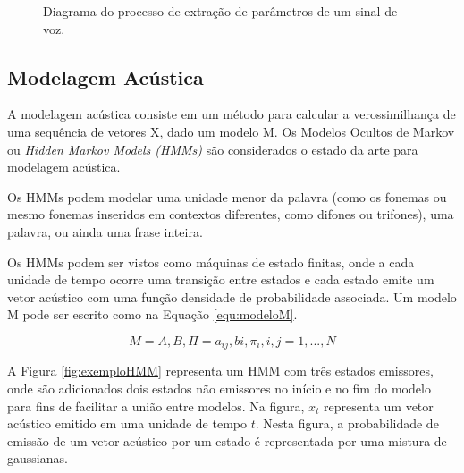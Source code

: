 \documentclass[12pt,a4paper,oneside]{report}
\begin{document}
\begin{figure}[h!]
\centering
{}\caption{Diagrama do processo de extração de parâmetros de um sinal de voz.}
\label{fig:extracao}
\end{figure}

\subsection{Modelagem Acústica}

A modelagem acústica consiste em um método para calcular a verossimilhança de uma sequência de vetores X, dado um modelo M. Os Modelos Ocultos de Markov ou \emph{Hidden Markov Models (HMMs)} são considerados o estado da arte para modelagem acústica.

Os HMMs podem modelar uma unidade menor da palavra (como os fonemas ou mesmo fonemas inseridos em contextos diferentes, como difones ou trifones), uma palavra, ou ainda uma frase inteira.

Os HMMs podem ser vistos como máquinas de estado finitas, onde a cada unidade de tempo ocorre uma transição entre estados e cada estado emite um vetor acústico com uma função densidade de probabilidade associada. Um modelo M pode ser escrito como na Equação \ref{equ:modeloM}.

\begin{equation}
M = A,B,\Pi = a_{ij} , bi, \pi_{i}, i, j = 1, ...,N
\label{equ:modeloM}
\end{equation}

A Figura \ref{fig:exemploHMM} representa um HMM com três estados emissores, onde são adicionados dois estados não emissores no início e no fim do modelo para fins de facilitar a união entre modelos. Na figura, $x_t$ representa um vetor acústico emitido em uma unidade de tempo $t$. Nesta figura, a probabilidade de emissão de um vetor acústico por um estado é representada por uma mistura de gaussianas.
\end{document}
